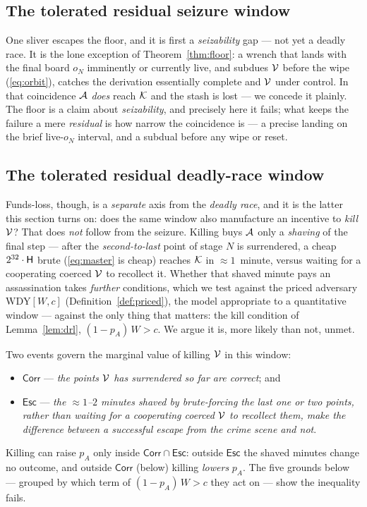 \subsection{The tolerated residual seizure window}
\label{sec:residual-seizure}

One sliver escapes the floor, and it is first a \emph{seizability} gap --- not yet a
deadly race. It is the lone exception of Theorem~\ref{thm:floor}: a wrench that lands
with the final board $o_N$ imminently or currently live, and subdues $\mathcal{V}$ before
the wipe (\eqref{eq:orbit}), catches the derivation essentially complete and $\mathcal{V}$
under control. In that coincidence $\mathcal{A}$ \emph{does} reach $\mathcal{K}$ and the stash is
lost --- we concede it plainly. The floor is a claim about \emph{seizability}, and
precisely here it fails; what keeps the failure a mere \emph{residual} is how narrow
the coincidence is --- a precise landing on the brief live-$o_N$ interval, and a
subdual before any wipe or reset.

\subsection{The tolerated residual deadly-race window}
\label{sec:residual-dr}

Funds-loss, though, is a \emph{separate} axis from the \emph{deadly race}, and it is
the latter this section turns on: does the same window also manufacture an incentive
to \emph{kill} $\mathcal{V}$? That does \emph{not} follow from the seizure. Killing buys
$\mathcal{A}$ only a \emph{shaving} of the final step --- after the
\emph{second-to-last} point of stage $N$ is surrendered, a cheap
$2^{32}\cdot\mathsf{H}$ brute (\eqref{eq:master} is cheap) reaches $\mathcal{K}$ in
${\approx}1$~minute, versus waiting for a cooperating coerced $\mathcal{V}$ to recollect
it. Whether that shaved minute pays an assassination takes \emph{further} conditions,
which we test against the priced adversary $\mathrm{WDY}[W,c]$
(Definition~\ref{def:priced}), the model appropriate to a quantitative window ---
against the only thing that matters: the kill condition of Lemma~\ref{lem:drl},
$(1 - p_A)\,W > c$. We argue it is, more likely than not, unmet.

Two events govern the marginal value of killing $\mathcal{V}$ in this window:
\begin{itemize}[nosep,leftmargin=1.4em]
  \item $\mathsf{Corr}$ --- \emph{the points $\mathcal{V}$ has surrendered so far are
        correct}; and
  \item $\mathsf{Esc}$ --- \emph{the ${\approx}1$--$2$ minutes shaved by
        brute-forcing the last one or two points, rather than waiting for a
        cooperating coerced $\mathcal{V}$ to recollect them, make the difference
        between a successful escape from the crime scene and not}.
\end{itemize}
Killing can raise $p_A$ only inside $\mathsf{Corr}\cap\mathsf{Esc}$: outside
$\mathsf{Esc}$ the shaved minutes change no outcome, and outside $\mathsf{Corr}$
(below) killing \emph{lowers} $p_A$. The five grounds below --- grouped by which
term of $(1 - p_A)\,W > c$ they act on --- show the inequality fails.

